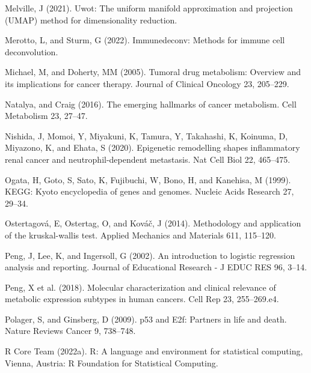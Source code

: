 \documentclass[
  parskip,
  openany]{scrreprt}
\newlength{\cslhangindent}
\newlength{\cslentryspacingunit} %
\newenvironment{CSLReferences}[2] %
 {%
  \setlength{\parindent}{0pt}
  \ifodd #1
  \let\oldpar\par
  \def\par{\hangindent=\cslhangindent\oldpar}
  \fi
  \setlength{\parskip}{#2\cslentryspacingunit}
 }%
 {}
\begin{document}
\begin{CSLReferences}{0}{0}
\leavevmode{}%
Melville, J (2021). Uwot: The uniform manifold approximation and
projection (UMAP) method for dimensionality reduction.

\leavevmode{}%
Merotto, L, and Sturm, G (2022). Immunedeconv: Methods for immune cell
deconvolution.

\leavevmode{}%
Michael, M, and Doherty, MM (2005). Tumoral drug metabolism: Overview
and its implications for cancer therapy. Journal of Clinical Oncology
23, 205--229.

\leavevmode{}%
Natalya, and Craig (2016). The emerging hallmarks of cancer metabolism.
Cell Metabolism 23, 27--47.

\leavevmode{}%
Nishida, J, Momoi, Y, Miyakuni, K, Tamura, Y, Takahashi, K, Koinuma, D,
Miyazono, K, and Ehata, S (2020). Epigenetic remodelling shapes
inflammatory renal cancer and neutrophil-dependent metastasis. Nat Cell
Biol 22, 465--475.

\leavevmode{}%
Ogata, H, Goto, S, Sato, K, Fujibuchi, W, Bono, H, and Kanehisa, M
(1999). KEGG: Kyoto encyclopedia of genes and genomes. Nucleic Acids
Research 27, 29--34.

\leavevmode{}%
Ostertagová, E, Ostertag, O, and Kováč, J (2014). Methodology and
application of the kruskal-wallis test. Applied Mechanics and Materials
611, 115--120.

\leavevmode{}%
Peng, J, Lee, K, and Ingersoll, G (2002). An introduction to logistic
regression analysis and reporting. Journal of Educational Research - J
EDUC RES 96, 3--14.

\leavevmode{}%
Peng, X et al. (2018). Molecular characterization and clinical relevance
of metabolic expression subtypes in human cancers. Cell Rep 23,
255--269.e4.

\leavevmode{}%
Polager, S, and Ginsberg, D (2009). p53 and E2f: Partners in life and
death. Nature Reviews Cancer 9, 738--748.

\leavevmode{}%
R Core Team (2022a). R: A language and environment for statistical
computing, Vienna, Austria: R Foundation for Statistical Computing.


\end{CSLReferences}
\end{document}
